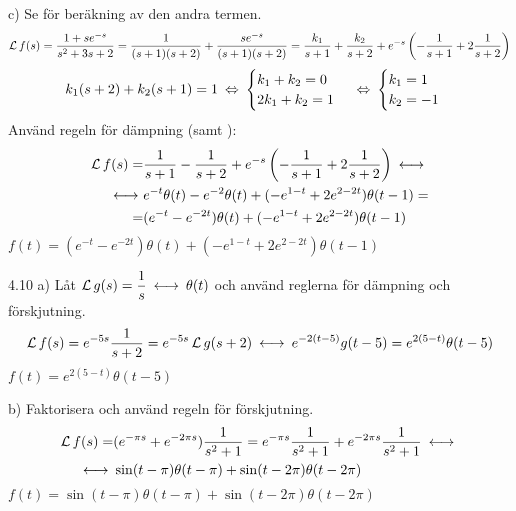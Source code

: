 \begin{task}{c)}
	Se  för beräkning av den andra termen.
	\[\operatorname{\mathcal{L}} f(s)=\frac{1+se^{-s}}{s^2+3s+2}=\frac{1}{(s+1)(s+2)}+\frac{se^{-s}}{(s+1)(s+2)}=\frac{k_1}{s+1}+\frac{k_2}{s+2}+e^{-s}\left(-\frac{1}{s+1}+2\frac{1}{s+2}\right)\]
	\[k_1(s+2)+k_2(s+1)=1\lra
	\begin{cases}
	k_1+k_2=0 \\
	2k_1+k_2=1
	\end{cases}\lra
	\begin{cases}
	k_1=1 \\
	k_2=-1
	\end{cases}\]
	Använd regeln för dämpning (samt ):
	\begin{align*}
	\laplace f(s)=
	&\frac{1}{s+1}-\frac{1}{s+2}+e^{-s}\left(-\frac{1}{s+1}+2\frac{1}{s+2}\right)\llra \\ \llra
	&e^{-t}\theta(t)-e^{-2}\theta(t)+(-e^{1-t}+2e^{2-2t})\theta(t-1)= \\ =
	&(e^{-t}-e^{-2t})\theta(t)+(-e^{1-t}+2e^{2-2t})\theta(t-1)
	\end{align*}
	\ans $f(t)=(e^{-t}-e^{-2t})\theta(t)+(-e^{1-t}+2e^{2-2t})\theta(t-1)$
\end{task}

\begin{task}{4.10 a)}
	Låt $\laplace g(s)=\dfrac{1}{s}\llra\theta(t)$ och använd reglerna för dämpning och förskjutning.
	\[\laplace f(s)=e^{-5s}\frac{1}{s+2}=e^{-5s}\laplace g(s+2) \llra e^{-2(t-5)}g(t-5)=e^{2(5-t)}\theta(t-5)\]
	\ans $f(t)=e^{2(5-t)}\theta(t-5)$
\end{task}

\begin{task}{b)}
	Faktorisera och använd regeln för förskjutning.
	\begin{align*}
	\laplace f(s)=
	&(e^{-\pi s}+e^{-2\pi s})\frac{1}{s^2+1}=
	e^{-\pi s}\frac{1}{s^2+1}+e^{-2\pi s}\frac{1}{s^2+1} \llra \\ \llra
	&\sin(t-\pi)\theta(t-\pi)+\sin(t-2\pi)\theta(t-2\pi)
	\end{align*}
	\ans $f(t)=\sin(t-\pi)\theta(t-\pi)+\sin(t-2\pi)\theta(t-2\pi)$
\end{task}

